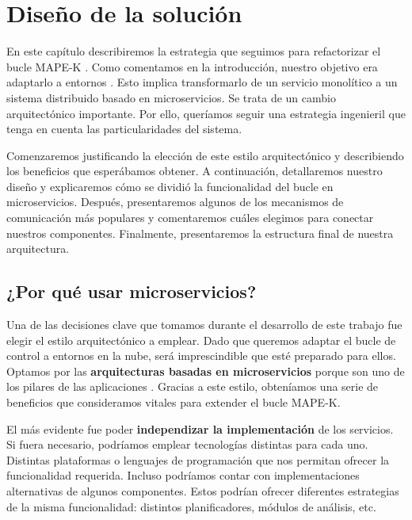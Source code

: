 \chapter{Diseño de la solución}
\label{chap:diseño}

En este capítulo describiremos la estrategia que seguimos para refactorizar el bucle MAPE-K . Como comentamos en la introducción, nuestro objetivo era adaptarlo a entornos . Esto implica transformarlo de un servicio monolítico a un sistema distribuido basado en microservicios. Se trata de un cambio arquitectónico importante. Por ello, queríamos seguir una estrategia ingenieril que tenga en cuenta las particularidades del sistema.

Comenzaremos justificando la elección de este estilo arquitectónico y describiendo los beneficios que esperábamos obtener. A continuación, detallaremos nuestro diseño y explicaremos cómo se dividió la funcionalidad del bucle en microservicios. Después, presentaremos algunos de los mecanismos de comunicación más populares y comentaremos cuáles elegimos para conectar nuestros componentes. Finalmente, presentaremos la estructura final de nuestra arquitectura.

\section{¿Por qué usar microservicios?}
\label{sec:por-que-microservicios}

Una de las decisiones clave que tomamos durante el desarrollo de este trabajo fue elegir el estilo arquitectónico a emplear. Dado que queremos adaptar el bucle de control a entornos en la nube, será imprescindible que esté preparado para ellos. Optamos por las \textbf{arquitecturas basadas en microservicios} porque son uno de los pilares de las aplicaciones . \cite{gannonCloudNativeApplications2017} Gracias a este estilo, obteníamos una serie de beneficios que consideramos vitales para extender el bucle MAPE-K.

El más evidente fue poder \textbf{independizar la implementación} de los servicios. Si fuera necesario, podríamos emplear tecnologías distintas para cada uno. Distintas plataformas o lenguajes de programación que nos permitan ofrecer la funcionalidad requerida. Incluso podríamos contar con implementaciones alternativas de algunos componentes. Estos podrían ofrecer diferentes estrategias de la misma funcionalidad: distintos planificadores, módulos de análisis, etc.

